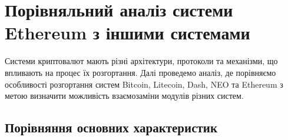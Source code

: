 \chapter{Порівняльний аналіз системи Ethereum з іншими системами}
\label{chap:theory}

Системи криптовалют мають різні архітектури, протоколи та механізми, що впливають на процес їх розгортання. Далі проведемо аналіз, де порівняємо особливості розгортання систем Bitcoin, Litecoin, Dash, NEO та Ethereum з метою визначити можливість взаємозаміни модулів різних систем.

\section{Порівняння основних характеристик}

% 
    
